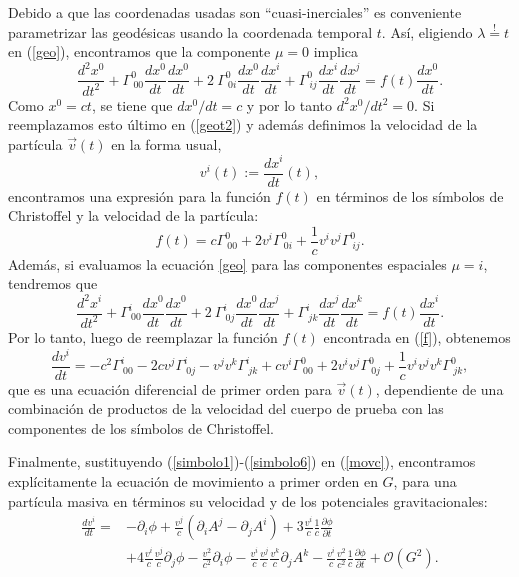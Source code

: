 Debido a que las coordenadas usadas son ``cuasi-inerciales'' es conveniente parametrizar las geodésicas usando la coordenada temporal $t$. Así, eligiendo $\lambda\stackrel{!}{=}t$ en (\ref{geo}), encontramos que la componente $\mu=0$ implica
\begin{equation}
\frac{d^2x^{0}}{dt^2}+\Gamma^{0}_{\ 00}\frac{dx^{0}}{dt}\frac{dx^{0}}{dt}+2\ \Gamma^{0}_{\ 0i}\frac{dx^{0}}{dt}\frac{dx^{i}}{dt}+\Gamma^{0}_{\ ij}\frac{dx^{i}}{dt}\frac{dx^{j}}{dt}=f(t)\frac{dx^{0}}{dt}.\label{geot2}
\end{equation}
Como $x^0=ct$, se tiene que $dx^0/dt=c$ y por lo tanto $d^2x^0/dt^2=0$. Si reemplazamos esto último en (\ref{geot2}) y además definimos la velocidad de la partícula $\vec{v}(t)$ en la forma usual,
\begin{equation}
v^i(t):=\frac{dx^i}{dt}(t),
\end{equation}
encontramos una expresión para la función $f(t)$ en términos de los símbolos de Christoffel y la velocidad de la partícula:
\begin{equation}
 f(t)=c\Gamma^{0}_{\ 00}+2v^i\Gamma^{0}_{\ 0i}+\frac{1}{c}v^iv^j\Gamma^{0}_{\ ij}.\label{f}
\end{equation}
Además, si evaluamos la ecuación \eqref{geo} para las componentes espaciales $\mu=i$, tendremos que
\begin{equation}
\frac{d^2x^{i}}{dt^2}+\Gamma^{i}_{\ 00}\frac{dx^{0}}{dt}\frac{dx^{0}}{dt}+2\ \Gamma^{i}_{\ 0j}\frac{dx^{0}}{dt}\frac{dx^{j}}{dt}+\Gamma^{i}_{\ jk}\frac{dx^{j}}{dt}\frac{dx^{k}}{dt}=f(t)\frac{dx^{i}}{dt}.\label{geoi}
\end{equation}
Por lo tanto, luego de reemplazar la función $f(t)$ encontrada en (\ref{f}), obtenemos
\begin{equation}
\frac{dv^{i}}{dt}=-c^2\Gamma^{i}_{\ 00}-2cv^j\Gamma^{i}_{\ 0j}-v^jv^k\Gamma^{i}_{\ jk}+cv^i\Gamma^{0}_{\ 00}+2v^iv^j\Gamma^{0}_{\ 0j}+\frac{1}{c}v^iv^jv^k\Gamma^{0}_{\ jk},\label{movc}
\end{equation}
que es una ecuación diferencial de primer orden para $\vec{v}(t)$, dependiente de una combinación de productos de la velocidad del cuerpo de prueba con las componentes de los símbolos de Christoffel.

Finalmente, sustituyendo (\ref{simbolo1})-(\ref{simbolo6}) en (\ref{movc}), encontramos explícitamente la ecuación de movimiento a primer orden en $G$, para una partícula masiva en términos su velocidad y de los potenciales gravitacionales:
\begin{align}
\frac{dv^{i}}{dt}={}&-\partial_i\phi+\frac{v^j}{c}(\partial_iA^{j}-\partial_jA^{i})+3\frac{v^i}{c}\frac{1}{c}\frac{\partial \phi}{\partial t}\nonumber\\
{}&+4\frac{v^i}{c}\frac{v^j}{c}\partial_j \phi-\frac{v^2}{c^2}\partial_i\phi-\frac{v^i}{c}\frac{v^j}{c}\frac{v^k}{c}\partial_j A^{k}-\frac{v^i}{c}\frac{v^2}{c^2}\frac{1}{c}\frac{\partial\phi}{\partial t}+\mathcal{O}(G^2).\label{movpot}
\end{align}

